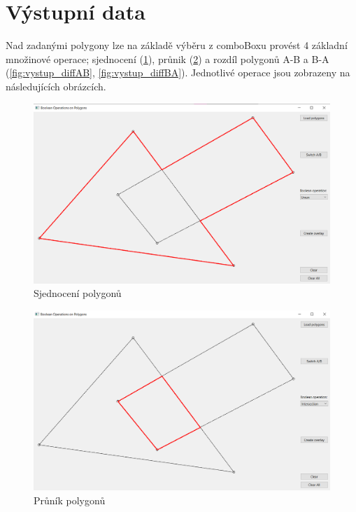 \documentclass[11pt]{article}
\begin{document}
\section{Výstupní data}

Nad zadanými polygony lze na základě výběru z comboBoxu provést 4 základní množinové operace; sjednocení (\ref{fig:vystup_union}), průnik (\ref{fig:vystup_intersection}) a rozdíl polygonů A-B a B-A (\ref{fig:vystup_diffAB}, \ref{fig:vystup_diffBA}). Jednotlivé operace jsou zobrazeny na následujících obrázcích.

\begin{figure}[htbh]
	\centering
	\captionsetup{justification=centering}
	\includegraphics[scale=0.42]{images/vystup_union.png} 
	\caption{Sjednocení polygonů}
	\label{fig:vystup_union}
\end{figure} 
\begin{figure}[htbh]
	\centering
	\captionsetup{justification=centering}
	\includegraphics[scale=0.42]{images/vystup_intersection.png} 
	\caption{Průník polygonů}						\label{fig:vystup_intersection}
\end{figure} 
\end{document}
